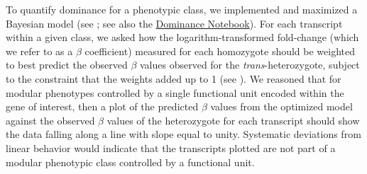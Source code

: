 \documentclass[10pt, twocolumn]{article}
\begin{document}
To quantify dominance for a phenotypic class, we implemented and maximized a
Bayesian model (see ; see also the
\href{https://wormlabcaltech.github.io/med-cafe/notebook/dominance.html}{Dominance
Notebook}). For each transcript within a given class, we asked how the
logarithm-transformed fold-change (which we refer to as a $\beta$ coefficient)
measured for each homozygote should be weighted to best predict the observed
$\beta$ values observed for the \emph{trans}-heterozygote, subject to the
constraint that the weights added up to 1 (see ). We
reasoned that for modular phenotypes controlled by a single functional unit
encoded within the gene of interest, then a plot of the predicted $\beta$ values
from the optimized model against the observed $\beta$ values of the heterozygote
for each transcript should show the data falling along a line with slope equal
to unity. Systematic deviations from linear behavior would indicate that the
transcripts plotted are not part of a modular phenotypic class controlled by a
functional unit.


\end{document}
